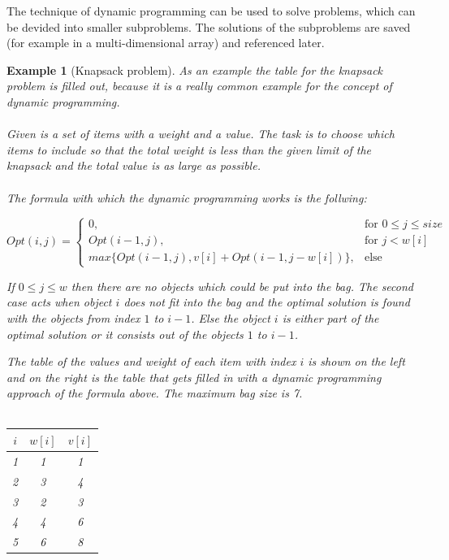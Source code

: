 \documentclass[a4paper, 11pt]{article}
\newtheorem*{example*}{Example}
\begin{document}
The technique of dynamic programming can be used to solve problems, which can be devided into smaller subproblems. The solutions of the subproblems are saved (for example in a multi-dimensional array) and referenced later. \cite{DP}
\\
\begin{example*}[Knapsack problem]

As an example the table for the knapsack problem is filled out, because it is a really common example for the concept of dynamic programming.
\\ \\
Given is a set of items with a weight and a value. The task is to choose which items to include so that the total weight is less than the given limit of the knapsack and the total value is as large as possible.
\\ \\
The formula with which the dynamic programming works is the follwing:


  $$
Opt(i,j)=
\begin{cases}
0, & \text{for } 0\leq j \leq size\\
        Opt(i-1, j), & \text{for } j < w[i]\\
        max\{ Opt(i-1, j), v[i]+Opt(i-1, j-w[i]) \}, & \text{else } 
\end{cases}
$$

If $0 \leq j \leq w$ then there are no objects which could be put into the bag. The second case acts when object $i$ does not fit into the bag and the optimal solution is found with the objects from index $1$ to $i-1$. Else the object $i$ is either part of the optimal solution or it consists out of the objects $1$ to $i-1$.


The table of the values and weight of each item with index $i$ is shown on the left and on the right is the table that gets filled in with a dynamic programming approach of the formula above. The maximum bag size is 7.
\\ \\
\begin{minipage}{0.3\textwidth}

\begin{tabular}{|c|c|c|}
\hline
$i$ & $w[i]$ & $v[i]$ \\
\hline
1 & 1 & 1 \\
2 & 3 & 4 \\
3 & 2 & 3 \\
4 & 4 & 6 \\
5 & 6 & 8 \\
\hline
\end{tabular}



\end{minipage}
\end{example*}
\end{document}
